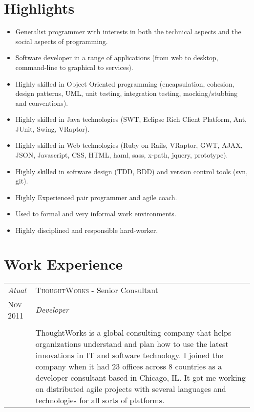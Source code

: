 \documentclass[letter,10pt]{article}
\begin{document}
\section{Highlights}

\begin{itemize}
\item Generalist programmer with interests in both the technical
  aspects and the social aspects of programming.
\item Software developer in a range of applications (from web to
  desktop, command-line to graphical to services).
\item Highly skilled in Object Oriented programming (encapsulation,
  cohesion, design patterns, UML, unit testing, integration testing,
  mocking/stubbing and conventions).
\item Highly skilled in Java technologies (SWT, Eclipse Rich Client
  Platform, Ant, JUnit, Swing, VRaptor).
\item Highly skilled in Web technologies (Ruby on Rails, VRaptor, GWT,
  AJAX, JSON, Javascript, CSS, HTML, haml, sass, x-path, jquery,
  prototype).
\item Highly skilled in software design (TDD, BDD) and version control
  tools (svn, git).
\item Highly Experienced pair programmer and agile coach.
\item Used to formal and very informal work environments.
\item Highly disciplined and responsible hard-worker.
\end{itemize}

\section{Work Experience}

\begin{tabular}{p{2.5cm}|p{13.5cm}}
  \emph{Atual} & \textsc{ThoughtWorks} - Senior Consultant\\
  \textsc{Nov 2011}& \emph{Developer}\\
  &\\
  &ThoughtWorks is a global consulting company that helps organizations understand and plan how to use the latest innovations in IT and software technology. I joined the company when it had 23 offices across 8 countries as a developer consultant based in Chicago, IL. It got me working on distributed agile projects with several languages and technologies for all sorts of platforms.
\end{tabular}
\end{document}
